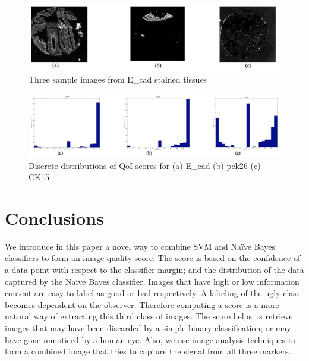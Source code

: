  \begin{figure}[H]
\centering
\includegraphics[width=1.0\textwidth]{img/ugly_samples}
\caption{Three sample images from E\_cad stained tissues}
\label{fig:ugly_samples}
\end{figure}

 \begin{figure}[H]
\centering
\includegraphics[width=1.0\textwidth]{img/ugly_distributions}
\caption{Discrete distributions of QoI scores for (a) E\_cad (b) pck26 (c) CK15}
\label{fig:ugly_distributions}
\end{figure}

\section{Conclusions}
We introduce in this paper a novel way to combine SVM and Naïve Bayes classifiers to form an image quality score.  The score is based on the confidence of a data point with respect to the classifier margin; and the distribution of the data captured by the Naïve Bayes classifier. Images that have high or low information content are easy to label as good or bad respectively. A labeling of the ugly class becomes dependent on the observer. Therefore computing a score is a more natural way of extracting this third class of images. The score helps us retrieve images that may have been discarded by a simple binary classification; or may have gone unnoticed by a human eye. Also, we use image analysis techniques to form a combined image that tries to capture the signal from all three markers.

